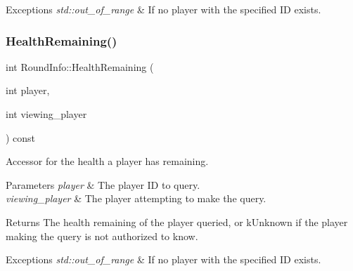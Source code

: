 \begin{DoxyExceptions}{Exceptions}
{\em std\+::out\+\_\+of\+\_\+range} & If no player with the specified ID exists. \\
\hline
\end{DoxyExceptions}
\mbox{\label{classroundinfo_1_1_round_info_accb2ab979f9fe090cf03753ed1c78e0a}} 
\subsubsection{\texorpdfstring{Health\+Remaining()}{HealthRemaining()}}
{\footnotesize\ttfamily int Round\+Info\+::\+Health\+Remaining (\begin{DoxyParamCaption}\item[{int}]{player,  }\item[{int}]{viewing\+\_\+player }\end{DoxyParamCaption}) const}



Accessor for the health a player has remaining. 


\begin{DoxyParams}{Parameters}
{\em player} & The player ID to query. \\
\hline
{\em viewing\+\_\+player} & The player attempting to make the query. \\
\hline
\end{DoxyParams}
\begin{DoxyReturn}{Returns}
The health remaining of the player queried, or {\ttfamily k\+Unknown} if the player making the query is not authorized to know. 
\end{DoxyReturn}

\begin{DoxyExceptions}{Exceptions}
{\em std\+::out\+\_\+of\+\_\+range} & If no player with the specified ID exists. \\
\hline
\end{DoxyExceptions}
\mbox{\label{classroundinfo_1_1_round_info_a0944e6bf6facb52e9955695ea0b3feb3}} 
